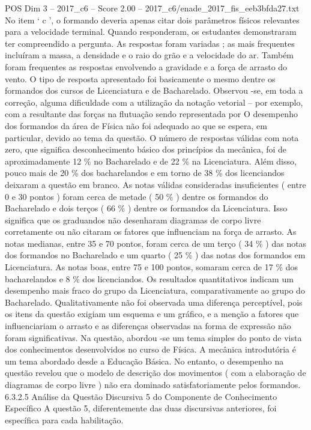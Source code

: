 \begin{textsample}{POS Dim 3 – 2017\_c6 – Score 2.00 – 2017\_c6/enade\_2017\_fis\_eeb3bfda27.txt}
No item ‘ c ’, o formando deveria apenas citar dois parâmetros físicos relevantes para a velocidade terminal.
Quando responderam, os estudantes demonstraram ter compreendido a pergunta.
As respostas foram variadas ; as mais frequentes incluíram a massa, a densidade e o raio do grão e a velocidade do ar.
Também foram frequentes as respostas envolvendo a gravidade e a força de arrasto do vento.
O tipo de resposta apresentado foi basicamente o mesmo dentre os formandos dos cursos de Licenciatura e de Bacharelado.
Observou -se, em toda a correção, alguma dificuldade com a utilização da notação vetorial – por exemplo, com a resultante das forças na flutuação sendo representada por O desempenho dos formandos da área de Física não foi adequado ao que se espera, em particular, devido ao tema da questão.
O número de respostas válidas com nota zero, que significa desconhecimento básico dos princípios da mecânica, foi de aproximadamente 12 \% no Bacharelado e de 22 \% na Licenciatura.
Além disso, pouco mais de 20 \% dos bacharelandos e em torno de 38 \% dos licenciandos deixaram a questão em branco.
As notas válidas consideradas insuficientes ( entre 0 e 30 pontos ) foram cerca de metade ( 50 \% ) dentre os formandos do Bacharelado e dois terços ( 66 \% ) dentre os formandos da Licenciatura.
Isso significa que os graduandos não desenharam diagramas de corpo livre corretamente ou não citaram os fatores que influenciam na força de arrasto.
As notas medianas, entre 35 e 70 pontos, foram cerca de um terço ( 34 \% ) das notas dos formandos no Bacharelado e um quarto ( 25 \% ) das notas dos formandos em Licenciatura.
As notas boas, entre 75 e 100 pontos, somaram cerca de 17 \% dos bacharelandos e 8 \% dos licenciandos.
Os resultados quantitativos indicam um desempenho mais fraco do grupo da Licenciatura, comparativamente ao grupo do Bacharelado.
Qualitativamente não foi observada uma diferença perceptível, pois os itens da questão exigiam um esquema e um gráfico, e a menção a fatores que influenciariam o arrasto e as diferenças observadas na forma de expressão não foram significativas.
Na questão, abordou -se um tema simples do ponto de vista dos conhecimentos desenvolvidos no curso de Física.
A mecânica introdutória é um tema abordado desde a Educação Básica.
No entanto, o desempenho na questão revelou que o modelo de descrição dos movimentos ( com a elaboração de diagramas de corpo livre ) não era dominado satisfatoriamente pelos formandos. 6.3.2.5 Análise da Questão Discursiva 5 do Componente de Conhecimento Específico A questão 5, diferentemente das duas discursivas anteriores, foi específica para cada habilitação.

\end{textsample}
